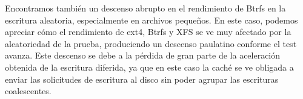 Encontramos también un descenso abrupto en el rendimiento de Btrfs en la escritura aleatoria, especialmente en archivos pequeños. En este caso, podemos apreciar cómo el rendimiento de ext4, Btrfs y XFS se ve muy afectado por la aleatoriedad de la prueba, produciendo un descenso paulatino conforme el test avanza. Este descenso se debe a la pérdida de gran parte de la aceleración obtenida de la escritura diferida, ya que en este caso la caché se ve obligada a enviar las solicitudes de escritura al disco sin poder agrupar las escrituras coalescentes.






